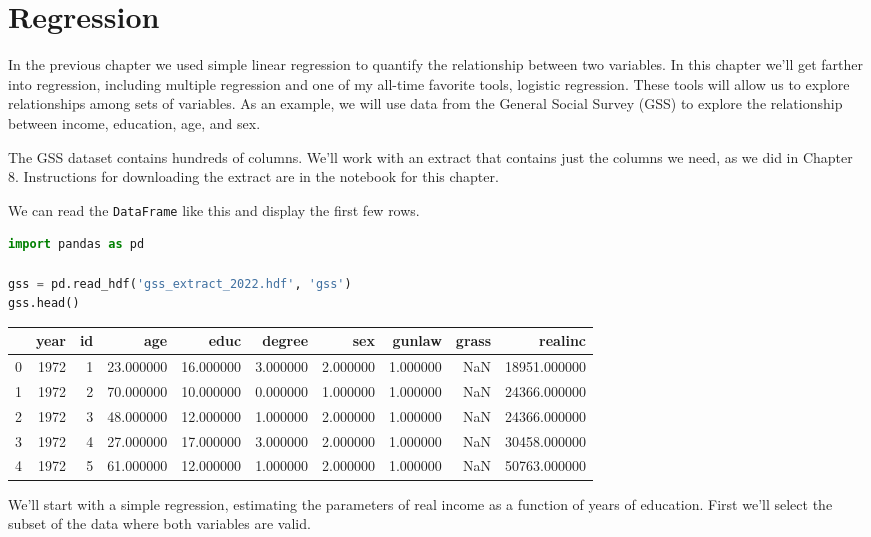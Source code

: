 \hypertarget{regression}{%
\chapter{Regression}\label{regression}}

In the previous chapter we used simple linear regression to quantify the
relationship between two variables. In this chapter we'll get farther
into regression, including multiple regression and one of my all-time
favorite tools, logistic regression. These tools will allow us to
explore relationships among sets of variables. As an example, we will
use data from the General Social Survey (GSS) to explore the
relationship between income, education, age, and sex.

The GSS dataset contains hundreds of columns. We'll work with an extract
that contains just the columns we need, as we did in Chapter 8.
Instructions for downloading the extract are in the notebook for this
chapter.

We can read the \passthrough{\lstinline!DataFrame!} like this and
display the first few rows.

\begin{lstlisting}[language=Python,style=source]
import pandas as pd

gss = pd.read_hdf('gss_extract_2022.hdf', 'gss')
gss.head()
\end{lstlisting}

\begin{tabular}{lrrrrrrrrr}
\midrule
 & year & id & age & educ & degree & sex & gunlaw & grass & realinc \\
\midrule
0 & 1972 & 1 & 23.000000 & 16.000000 & 3.000000 & 2.000000 & 1.000000 & NaN & 18951.000000 \\
1 & 1972 & 2 & 70.000000 & 10.000000 & 0.000000 & 1.000000 & 1.000000 & NaN & 24366.000000 \\
2 & 1972 & 3 & 48.000000 & 12.000000 & 1.000000 & 2.000000 & 1.000000 & NaN & 24366.000000 \\
3 & 1972 & 4 & 27.000000 & 17.000000 & 3.000000 & 2.000000 & 1.000000 & NaN & 30458.000000 \\
4 & 1972 & 5 & 61.000000 & 12.000000 & 1.000000 & 2.000000 & 1.000000 & NaN & 50763.000000 \\
\midrule
\end{tabular}

We'll start with a simple regression, estimating the parameters of real
income as a function of years of education. First we'll select the
subset of the data where both variables are valid.

